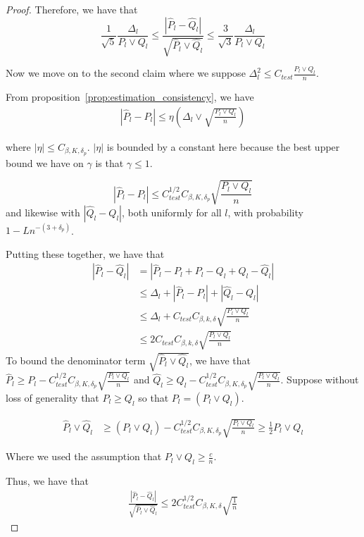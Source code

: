\begin{proof}
Therefore, we have that
\[
\frac{1}{\sqrt{5}} \frac{\Delta_l}{P_l \vee Q_l} \leq \frac{ | \hat{P}_l - \hat{Q}_l | }{\sqrt{ \hat{P}_l \vee \hat{Q}_l}} \leq \frac{3}{\sqrt{3}} \frac{\Delta_l}{P_l \vee Q_l}
\]


Now we move on to the second claim where we suppose $\Delta_l^2 \leq C_{test} \frac{P_l \vee Q_l}{n}$.

From proposition~\ref{prop:estimation_consistency}, we have
\begin{align*}
|\hat{P}_l - P_l| \leq \eta \left( \Delta_l \vee \sqrt{\frac{P_l \vee Q_l}{n} } \right)
\end{align*}

where $|\eta| \leq C_{\beta, K, \delta_p}$. $|\eta|$ is bounded by a constant here because the best upper bound we have on $\gamma$ is that $\gamma \leq 1$. 

\[
| \hat{P}_l - P_l | \leq C^{1/2}_{test} C_{\beta, K, \delta_p} \sqrt{ \frac{P_l \vee Q_l}{n} } 
\]
and likewise with $|\hat{Q}_l - Q_l|$, both uniformly for all $l$, with probability $1 - L n^{-(3+\delta_p)}$. 

Putting these together, we have that
\begin{align*}
|\hat{P}_l - \hat{Q}_l| &= | \hat{P}_l - P_l + P_l - Q_l + Q_l - \hat{Q}_l| \\
    &\leq \Delta_l + | \hat{P}_l - P_l| + |\hat{Q}_l - Q_l| \\
    &\leq \Delta_l + C_{test} C_{\beta, k, \delta} \sqrt{ \frac{P_l \vee Q_l}{n} } \\
    &\leq 2 C_{test} C_{\beta, k, \delta} \sqrt{ \frac{P_l \vee Q_l}{n} }
\end{align*}
To bound the denominator term $\sqrt{ \hat{P}_l \vee \hat{Q}_l}$, we have that $\hat{P}_l \geq P_l - C_{test}^{1/2} C_{\beta, K, \delta_p} \sqrt{ \frac{P_l \vee Q_l}{n} }$ and $\hat{Q}_l \geq Q_l - C_{test}^{1/2} C_{\beta, K, \delta_p} \sqrt{ \frac{P_l \vee Q_l}{n}}$. Suppose without loss of generality that $P_l \geq Q_l$ so that $P_l = (P_l \vee Q_l)$. 

\begin{align*}
\hat{P}_l \vee \hat{Q}_l &\geq (P_l \vee Q_l) - C_{test}^{1/2} C_{\beta, K, \delta_p} \sqrt{ \frac{P_l \vee Q_l}{n}} \geq \frac{1}{2} P_l \vee Q_l
\end{align*} 

Where we used the assumption that $P_l \vee Q_l \geq \frac{c}{n}$.

Thus, we have that
\begin{align*}
\frac{| \hat{P}_l - \hat{Q}_l| }{\sqrt{ \hat{P}_l \vee \hat{Q}_l} } \leq 2 C^{1/2}_{test} C_{\beta, K, \delta} \sqrt{ \frac{1}{n} }
\end{align*}

\end{proof}


